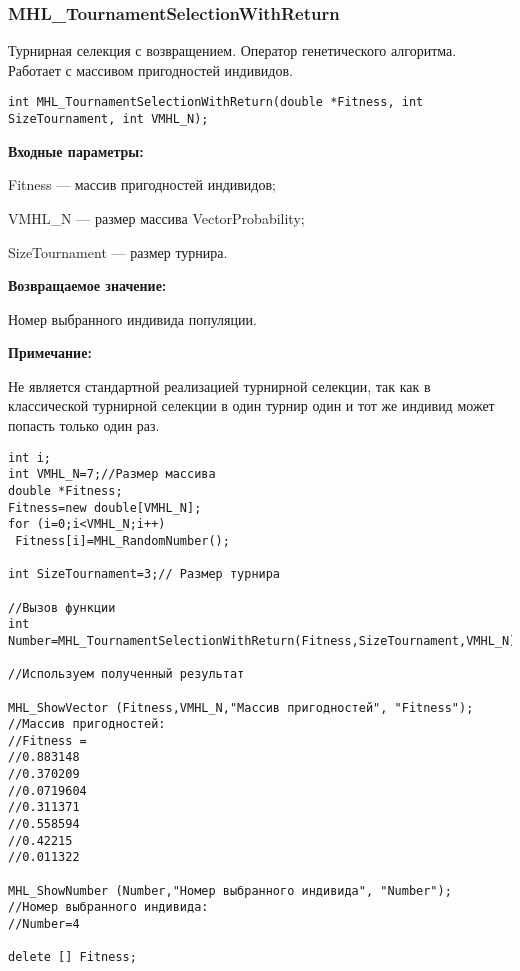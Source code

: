 \documentclass[a4paper,12pt]{article}
\begin{document}
\subsubsection{MHL\_TournamentSelectionWithReturn}\label{MHL_TournamentSelectionWithReturn}

Турнирная селекция с возвращением. Оператор генетического алгоритма. Работает с массивом пригодностей индивидов.


\begin{lstlisting}[label=code_syntax_MHL_TournamentSelectionWithReturn,caption=Синтаксис]
int MHL_TournamentSelectionWithReturn(double *Fitness, int SizeTournament, int VMHL_N);
\end{lstlisting}

\textbf{Входные параметры:}
 
Fitness --- массив пригодностей индивидов;
 
VMHL\_N --- размер массива VectorProbability;
 
SizeTournament --- размер турнира.

\textbf{Возвращаемое значение:} 

 Номер выбранного индивида популяции.

\textbf{Примечание:}

 Не является стандартной реализацией турнирной селекции, так как в классической турнирной селекции в один турнир один и тот же индивид может попасть только один раз.




\begin{lstlisting}[label=code_use_MHL_TournamentSelectionWithReturn,caption=Пример использования]
int i;
int VMHL_N=7;//Размер массива
double *Fitness;
Fitness=new double[VMHL_N];
for (i=0;i<VMHL_N;i++)
 Fitness[i]=MHL_RandomNumber();

int SizeTournament=3;// Размер турнира

//Вызов функции
int Number=MHL_TournamentSelectionWithReturn(Fitness,SizeTournament,VMHL_N);

//Используем полученный результат

MHL_ShowVector (Fitness,VMHL_N,"Массив пригодностей", "Fitness");
//Массив пригодностей:
//Fitness =	
//0.883148
//0.370209
//0.0719604
//0.311371
//0.558594
//0.42215
//0.011322

MHL_ShowNumber (Number,"Номер выбранного индивида", "Number");
//Номер выбранного индивида:
//Number=4

delete [] Fitness;
\end{lstlisting}
\end{document}
